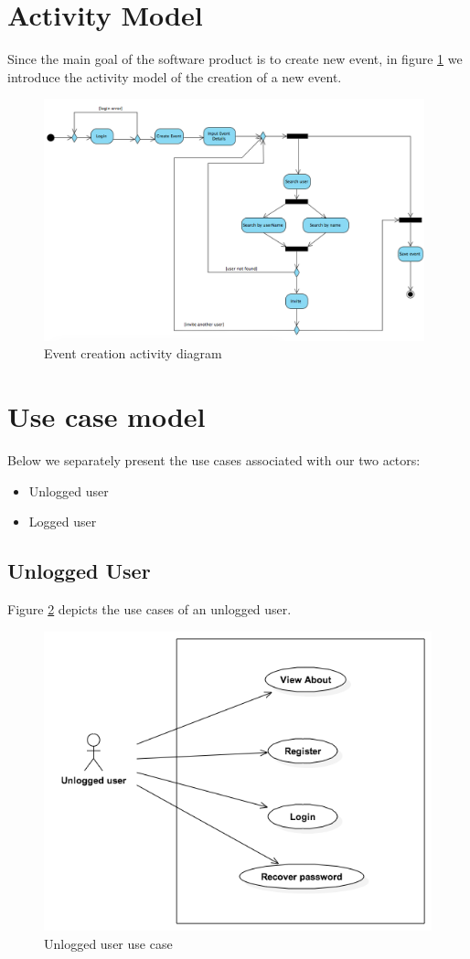 \documentclass[10pt,a4paper,titlepage]{article}
\begin{document}
\section{Activity Model}
Since the main goal of the software product is to create new event, in figure \ref{fig:ActivityDiag} we introduce the activity model of the creation of a new event.
\begin{figure}[h!]
\centering
\includegraphics[height=7cm]{./Uml/ActivityDiagram.png}
\caption[ActivityDiag]{Event creation activity diagram}
\label{fig:ActivityDiag}
\end{figure}

\section{Use case model}
Below we separately present the use cases associated with our two actors:
\begin{itemize}
\item Unlogged user
\item Logged user
\end{itemize}


\subsection{Unlogged User}
Figure \ref{fig:Unlogged_usc} depicts the use cases of an unlogged user.
\begin{figure}[h]
\centering
\includegraphics[width=\linewidth]{./Use_case/unlogged_usecase.png}
\caption[Unlogged_usc]{Unlogged user use case}
\label{fig:Unlogged_usc}
\end{figure}
\end{document}
